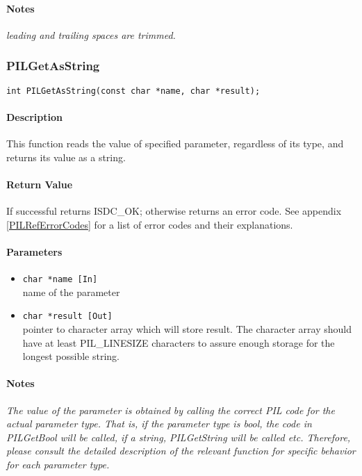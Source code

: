 \paragraph{Notes\\}
{\it
leading and trailing spaces are trimmed.
}



\subsubsection{PILGetAsString}

\begin{verbatim}
int PILGetAsString(const char *name, char *result);
\end{verbatim}

\paragraph{Description\\}
This function reads the value of specified parameter, regardless of its type,
and returns its value as a string.

\paragraph{Return Value\\}
If successful returns ISDC\_OK; otherwise returns an error code. See appendix \ref{PILRefErrorCodes}
for a list of error codes and their explanations.

\paragraph{Parameters}
\begin{itemize}
\item
{\tt char *name [In] } \\
name of the parameter
\item
{\tt char *result [Out] } \\
pointer to character array which will store result. The character array
should have at least PIL\_LINESIZE characters to assure enough storage for the longest
possible string. 
\end{itemize}


\paragraph{Notes\\}
{\it
The value of the parameter is obtained by calling the correct PIL code
for the actual parameter type. That is, if the parameter type is bool, the
code in PILGetBool will be called, if a string, PILGetString will be
called etc. Therefore, please consult the detailed description of the
relevant function for specific behavior for each parameter type.
}


